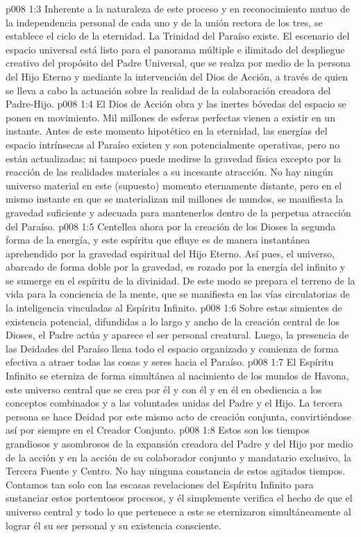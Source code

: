 \vs p008 1:3 Inherente a la naturaleza de este proceso y en reconocimiento mutuo de la independencia personal de cada uno y de la unión rectora de los tres, se establece el ciclo de la eternidad. La Trinidad del Paraíso existe. El escenario del espacio universal está listo para el panorama múltiple e ilimitado del despliegue creativo del propósito del Padre Universal, que se realza por medio de la persona del Hijo Eterno y mediante la intervención del Dios de Acción, a través de quien se lleva a cabo la actuación sobre la realidad de la colaboración creadora del Padre\hyp{}Hijo.
\vs p008 1:4 \pc El Dios de Acción obra y las inertes bóvedas del espacio se ponen en movimiento. Mil millones de esferas perfectas vienen a existir en un instante. Antes de este momento hipotético en la eternidad, las energías del espacio intrínsecas al Paraíso existen y son potencialmente operativas, pero no están actualizadas; ni tampoco puede medirse la gravedad física excepto por la reacción de las realidades materiales a su incesante atracción. No hay ningún universo material en este (supuesto) momento eternamente distante, pero en el mismo instante en que se materializan mil millones de mundos, se manifiesta la gravedad suficiente y adecuada para mantenerlos dentro de la perpetua atracción del Paraíso.
\vs p008 1:5 Centellea ahora por la creación de los Dioses la segunda forma de la energía, y este espíritu que efluye es de manera instantánea aprehendido por la gravedad espiritual del Hijo Eterno. Así pues, el universo, abarcado de forma doble por la gravedad, es rozado por la energía del infinito y se sumerge en el espíritu de la divinidad. De este modo se prepara el terreno de la vida para la conciencia de la mente, que se manifiesta en las vías circulatorias de la inteligencia vinculadas al Espíritu Infinito.
\vs p008 1:6 Sobre estas simientes de existencia potencial, difundidas a lo largo y ancho de la creación central de los Dioses, el Padre actúa y aparece el ser personal creatural. Luego, la presencia de las Deidades del Paraíso llena todo el espacio organizado y comienza de forma efectiva a atraer todas las cosas y seres hacia el Paraíso.
\vs p008 1:7 \pc El Espíritu Infinito se eterniza de forma simultánea al nacimiento de los mundos de Havona, este universo central que se crea por él y con él y en él en obediencia a los conceptos combinados y a las voluntades unidas del Padre y el Hijo. La tercera persona se hace Deidad por este mismo acto de creación conjunta, convirtiéndose así por siempre en el Creador Conjunto.
\vs p008 1:8 \pc Estos son los tiempos grandiosos y asombrosos de la expansión creadora del Padre y del Hijo por medio de la acción y en la acción de su colaborador conjunto y mandatario exclusivo, la Tercera Fuente y Centro. No hay ninguna constancia de estos agitados tiempos. Contamos tan solo con las escasas revelaciones del Espíritu Infinito para sustanciar estos portentosos procesos, y él simplemente verifica el hecho de que el universo central y todo lo que pertenece a este se eternizaron simultáneamente al lograr él su ser personal y su existencia consciente.
